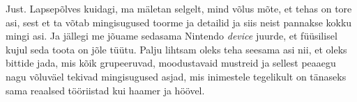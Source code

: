 
Just. Lapsepõlves kuidagi, ma mäletan selgelt, mind võlus mõte, et tehas on tore asi, sest et ta võtab mingisugused toorme ja detailid ja siis neist pannakse kokku mingi asi. Ja jällegi me jõuame sedasama  Nintendo \emph{device} juurde, et füüsilisel kujul seda toota on jõle tüütu. Palju lihtsam oleks teha seesama asi nii, et oleks bittide jada, mis kõik grupeeruvad, moodustavaid mustreid ja sellest peaaegu nagu võluväel tekivad mingisugused asjad, mis inimestele tegelikult on tänaseks sama reaalsed tööriistad kui haamer ja höövel.
